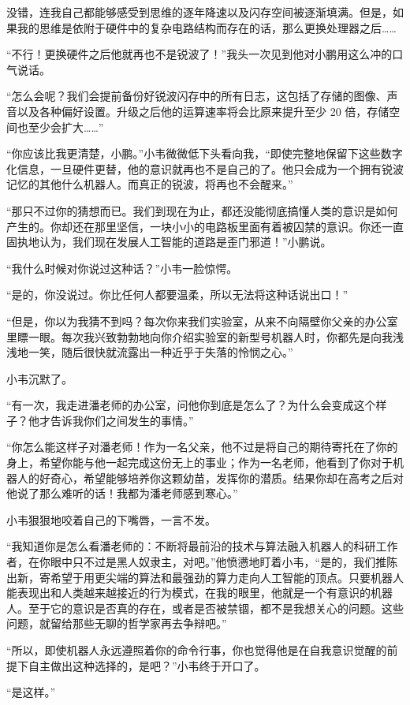 \documentclass[punct=kaiming, zihao=5, openany, fontset=sikou]{ctexbook}
\begin{document}
没错，连我自己都能够感受到思维的逐年降速以及闪存空间被逐渐填满。但是，如果我的思维是依附于硬件中的复杂电路结构而存在的话，那么更换处理器之后……

“不行！更换硬件之后他就再也不是锐波了！”我头一次见到他对小鹏用这么冲的口气说话。

“怎么会呢？我们会提前备份好锐波闪存中的所有日志，这包括了存储的图像、声音以及各种偏好设置。升级之后他的运算速率将会比原来提升至少 20 倍，存储空间也至少会扩大……”

“你应该比我更清楚，小鹏。”小韦微微低下头看向我，“即使完整地保留下这些数字化信息，一旦硬件更替，他的意识就再也不是自己的了。他只会成为一个拥有锐波记忆的其他什么机器人。而真正的锐波，将再也不会醒来。”

“那只不过你的猜想而已。我们到现在为止，都还没能彻底搞懂人类的意识是如何产生的。你却还在那里坚信，一块小小的电路板里面有着被囚禁的意识。你还一直固执地认为，我们现在发展人工智能的道路是歪门邪道！”小鹏说。

“我什么时候对你说过这种话？”小韦一脸惊愕。

“是的，你没说过。你比任何人都要温柔，所以无法将这种话说出口！”

“但是，你以为我猜不到吗？每次你来我们实验室，从来不向隔壁你父亲的办公室里瞟一眼。每次我兴致勃勃地向你介绍实验室的新型号机器人时，你都先是向我浅浅地一笑，随后很快就流露出一种近乎于失落的怜悯之心。”

小韦沉默了。

“有一次，我走进潘老师的办公室，问他你到底是怎么了？为什么会变成这个样子？他才告诉我你们之间发生的事情。”

“你怎么能这样子对潘老师！作为一名父亲，他不过是将自己的期待寄托在了你的身上，希望你能与他一起完成这份无上的事业；作为一名老师，他看到了你对于机器人的好奇心，希望能够培养你这颗幼苗，发挥你的潜质。结果你却在高考之后对他说了那么难听的话！我都为潘老师感到寒心。”

小韦狠狠地咬着自己的下嘴唇，一言不发。

“我知道你是怎么看潘老师的：不断将最前沿的技术与算法融入机器人的科研工作者，在你眼中只不过是黑人奴隶主，对吧。”他愤懑地盯着小韦，“是的，我们推陈出新，寄希望于用更尖端的算法和最强劲的算力走向人工智能的顶点。只要机器人能表现出和人类越来越接近的行为模式，在我的眼里，他就是一个有意识的机器人。至于它的意识是否真的存在，或者是否被禁锢，都不是我想关心的问题。这些问题，就留给那些无聊的哲学家再去争辩吧。”

“所以，即使机器人永远遵照着你的命令行事，你也觉得他是在自我意识觉醒的前提下自主做出这种选择的，是吧？”小韦终于开口了。

“是这样。”
\end{document}
